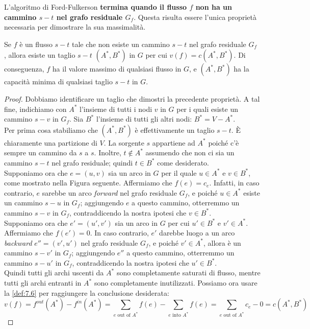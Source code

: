 L'algoritmo di Ford-Fulkerson \textbf{termina quando il flusso $f$ non
	ha un cammino $s-t$ nel grafo residuale $G_f$}. Questa risulta
essere l'unica proprietà necessaria per dimostrare la sua massimalità.

\begin{myblockquote}
	\begin{minipage}{\textwidth}
		\begin{definition}\label{def:7.9}
			Se $f$ è un flusso $s-t$ tale che non esiste un cammino $s-t$ nel
			grafo residuale $G_f$ , allora esiste un taglio $s-t$
			$(A^{*} , B^{*})$ in $G$ per cui $v(f) = c(A^{*} , B^{*})$. Di
			conseguenza, $f$ ha il valore massimo di qualsiasi flusso in $G$, e
			$(A^{*} , B^{*})$ ha la capacità minima di qualsiasi taglio $s-t$ in
			$G$.
		\end{definition}
	\end{minipage}
\end{myblockquote}


\begin{proof}
	Dobbiamo identificare un taglio che dimostri la precedente proprietà. A
	tal fine, indichiamo con $A^{*}$ l'insieme di tutti i nodi $v$ in
	$G$ per i quali esiste un cammino $s-v$ in $G_f$. Sia $B^{*}$
	l'insieme di tutti gli altri nodi: $B^{*} = V - A^{*}$.\\

	Per prima cosa stabiliamo che $(A^{*} , B^{*})$ è effettivamente un taglio
	$s-t$. È chiaramente una partizione di $V$. La sorgente $s$
	appartiene ad $A^{*}$ poiché c'è sempre un cammino da $s$ a $s$.
	Inoltre, $t \notin A^{*}$ assumendo che non ci sia un cammino $s-t$
	nel grafo residuale; quindi $t \in B^*$ come desiderato.\\

	Supponiamo ora che $e = (u, v)$ sia un arco in $G$ per il quale
	$u \in A^{*}$ e $v \in B^{*}$, come mostrato nella Figura seguente.
	Affermiamo che $f(e) = c_e$. Infatti, in caso contrario, $e$
	sarebbe un arco \emph{forward} nel grafo residuale $G_f$, e poiché
	$u \in A^{*}$ esiste un cammino $s-u$ in $G_f$; aggiungendo $e$ a
	questo cammino, otterremmo un cammino $s-v$ in $G_f$,
	contraddicendo la nostra ipotesi che $v \in B^{*}$.\\

	Supponiamo ora che $e' = (u' , v')$ sia un arco in $G$ per cui
	$u' \in B^{*}$ e $v' \in A^{*}$. Affermiamo che $f(e') = 0$. In caso
	contrario, $e'$ darebbe luogo a un arco \emph{backward}
	$e'' = (v' , u')$ nel grafo residuale $G_f$, e poiché
	$v' \in A^{*}$, allora è un cammino $s-v'$ in $G_f$; aggiungendo
	$e''$ a questo cammino, otterremmo un cammino $s-u'$ in $G_f$,
	contraddicendo la nostra ipotesi che $u' \in B^{*}$.\\

	Quindi tutti gli archi uscenti da $A^{*}$ sono completamente saturati di
	flusso, mentre tutti gli archi entranti in $A^{*}$ sono completamente
	inutilizzati. Possiamo ora usare la \ref{def:7.6} per raggiungere la conclusione
	desiderata:
	$$
		v(f) = f^{out}(A^{*}) - f^{in}(A^{*}) = \sum_{e \text{ out of }A^{*}} f(e) - \sum_{e \text{ into }A^{*}}f(e) = \sum_{e \text{ out of }A^{*}} c_e - 0 = c(A^{*}, B^{*})
	$$
\end{proof}

